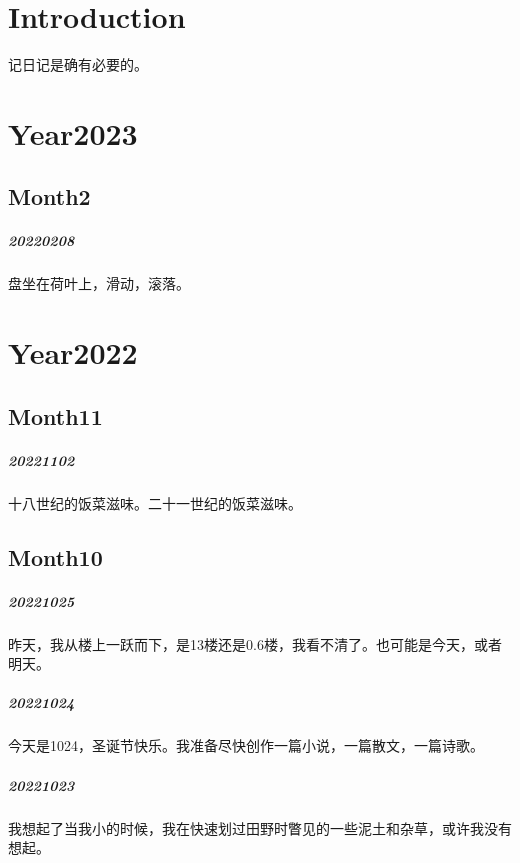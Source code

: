 \documentclass[UTF8]{book}
\begin{document}
\chapter{Introduction}

记日记是确有必要的。

\chapter{Year2023}
\section{Month2}
\paragraph{20220208}

盘坐在荷叶上，滑动，滚落。


\chapter{Year2022}


\section{Month11}
\paragraph{20221102}
十八世纪的饭菜滋味。二十一世纪的饭菜滋味。

\section{Month10}

\paragraph{20221025}
昨天，我从楼上一跃而下，是13楼还是0.6楼，我看不清了。也可能是今天，或者明天。

\paragraph{20221024}
今天是1024，圣诞节快乐。我准备尽快创作一篇小说，一篇散文，一篇诗歌。

\paragraph{20221023}
我想起了当我小的时候，我在快速划过田野时瞥见的一些泥土和杂草，或许我没有想起。
\end{document}
